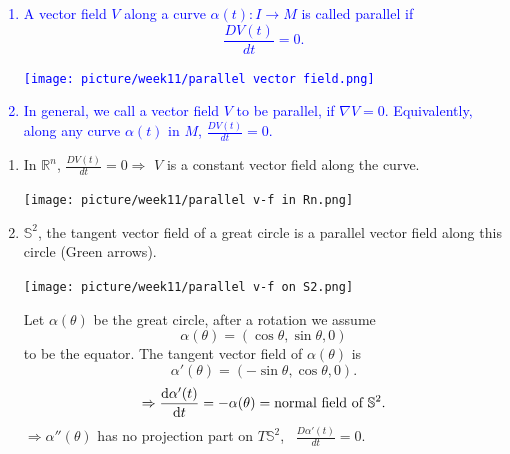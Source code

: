 \textcolor{blue}{
    \begin{definition}
        \begin{enumerate}[(1)]
            \item A vector field \(V\) along a curve \(\alpha(t)\colon
            I\to M\) is called parallel if 
            \[
                \frac{DV(t)}{dt}=0   . 
            \]
            \begin{center}
                \texttt{[image: picture/week11/parallel 
                vector field.png]}
            \end{center}
            \item In general, we call a vector field \(V\) to be parallel, 
            if \(\nabla V=0\). Equivalently, along any curve \(\alpha(t)\)
            in \(M\), \(\frac{DV(t)}{dt}=0\).
        \end{enumerate}
    \end{definition}
}
\begin{example}
    \begin{enumerate}[(1)]
        \item In \(\mathbb{R}^n\), \(\frac{DV(t)}{dt}=0\Rightarrow\) \(V\)
        is a constant vector field along the curve.
        \begin{center}
            \texttt{[image: picture/week11/parallel 
            v-f in Rn.png]}
        \end{center}
        \item \(\mathbb{S}^2\), the tangent vector field of a 
        great circle is a parallel vector field along this circle
        (Green arrows).
        \begin{center}
            \texttt{[image: picture/week11/parallel 
            v-f on S2.png]}
        \end{center}
        Let \(\alpha(\theta)\) be the great circle, after a
        rotation we assume
        \[
            \alpha(\theta)=\left(\cos\theta,\sin\theta,0\right)
        \]
        to be the equator. The tangent vector field of \(\alpha(\theta)\)
        is 
        \[
            \alpha'(\theta)=\left(-\sin\theta,\cos\theta,0\right)    .
        \]
        \[
            \Rightarrow \dv{\alpha'(t)}{t}=-\alpha(\theta)=\text{normal
            field of }\mathbb{S}^2.    
        \]
        \(\Rightarrow \alpha''(\theta)\) has no projection part
        on \(T\mathbb{S}^2\), \ie\ \(\frac{D\alpha'(t)}{dt}=0\).
    \end{enumerate}
\end{example}
